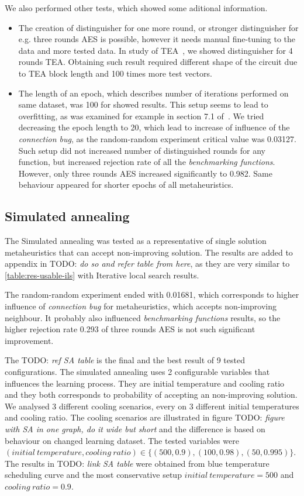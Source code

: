 \documentclass[
  print, %
  Table,   %
  nolof,     %
  nolot,     %
  11pt, %
  oneside  %
]{fithesis3}
\newcommand{\todo}[1]{TODO: \textit{#1}}
\begin{document}
We also performed other tests, which showed some aditional information.

\begin{itemize}
    \item The creation of distinguisher for one more round, or stronger distinguisher for e.g. three rounds AES is possible, however it needs manual fine-tuning to the data and more tested data. In study of TEA~\cite{kubicek2016new}, we showed distinguisher for 4 rounds TEA. Obtaining such result required different shape of the circuit due to TEA block length and 100 times more test vectors.
    \item The length of an epoch, which describes number of iterations performed on same dataset, was 100 for showed results. This setup seems to lead to overfitting, as was examined for example in section 7.1 of~\cite{ukropBcThesis}. We tried decreasing the epoch length to 20, which lead to increase of influence of the \textit{connection bug}, as the random-random experiment critical value was 0.03127. Such setup did not increased number of distinguished rounds for any function, but increased rejection rate of all the \textit{benchmarking functions}. However, only three rounds AES increased significantly to 0.982. Same behaviour appeared for shorter epochs of all metaheuristics.
\end{itemize}


\subsection{Simulated annealing}
\label{subsec:res-ss-sa}

The Simulated annealing was tested as a representative of single solution metaheuristics that can accept non-improving solution. The results are added to appendix in \todo{do so and refer table from here}, as they are very similar to \cref{table:res-usable-ils} with Iterative local search results.

The random-random experiment ended with 0.01681, which corresponds to higher influence of \textit{connection bug} for metaheuristics, which accepts non-improving neighbour. It probably also influenced \textit{benchmarking functions} results, so the higher rejection rate 0.293 of three rounds AES is not such significant improvement.

The \todo{ref SA table} is the final and the best result of 9 tested configurations. The simulated annealing uses 2 configurable variables that influences the learning process. They are initial temperature and cooling ratio and they both corresponds to probability of accepting an non-improving solution. We analysed 3 different cooling scenarios, every on 3 different initial temperatures and cooling ratio. The cooling scenarios are illustrated in figure \todo{figure with SA in one graph, do it wide but short} and the difference is based on behaviour on changed learning dataset. The tested variables were $(\mathit{initial~temperature, cooling~ratio}) \in \{ (500, 0.9), (100, 0.98), (50, 0.995) \}$. The results in \todo{link SA table} were obtained from blue temperature scheduling curve and the most conservative setup $\mathit{initial~temperature} = 500$ and $\mathit{cooling~ratio} = 0.9$.
\end{document}
